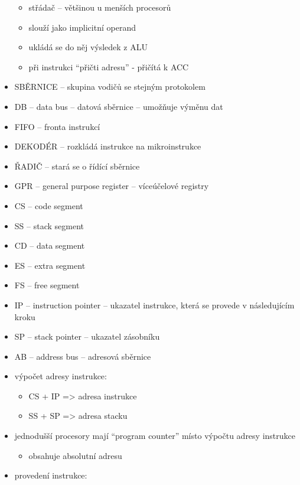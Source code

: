 \documentclass[a4paper,12pt]{article}
\providecommand{\tightlist}{%
\setlength{\itemsep}{0pt}\setlength{\parskip}{0pt}}
\begin{document}
\begin{itemize}
  \begin{itemize}
    \tightlist
    \item střádač -- většinou u menších procesorů
    \item slouží jako implicitní operand
    \item ukládá se do něj výsledek z ALU
    \item při instrukci ``přičti adresu'' - přičítá k ACC
  \end{itemize}
  \item SBĚRNICE -- skupina vodičů se stejným protokolem
  \item DB -- data bus -- datová sběrnice -- umožňuje výměnu dat
  \item FIFO -- fronta instrukcí
  \item DEKODÉR -- rozkládá instrukce na mikroinstrukce
  \item ŘADIČ -- stará se o řídící sběrnice
  \item GPR -- general purpose register -- víceúčelové registry
  \item CS -- code segment
  \item SS -- stack segment
  \item CD -- data segment
  \item ES -- extra segment
  \item FS -- free segment
  \item IP -- instruction pointer -- ukazatel instrukce, která se provede v
  následujícím kroku
  \item SP -- stack pointer -- ukazatel zásobníku
  \item AB -- address bus -- adresová sběrnice
  \item výpočet adresy instrukce:
  
  \begin{itemize}
    \tightlist
    \item CS + IP =\textgreater{} adresa instrukce
    \item SS + SP =\textgreater{} adresa stacku
  \end{itemize}
  \item jednodušší procesory mají ``program counter'' místo výpočtu adresy
  instrukce
  
  \begin{itemize}
    \tightlist
    \item obsahuje absolutní adresu
  \end{itemize}
  \item provedení instrukce:
  

\end{itemize}
\end{document}
